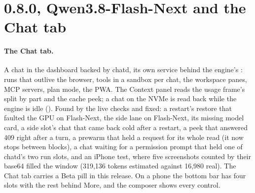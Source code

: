 \section*{0.8.0, Qwen3.8-Flash-Next and the Chat tab}

\paragraph{The Chat tab.} A chat in the dashboard backed by chatd, its own service behind the engine's : runs that outlive the browser, tools in a sandbox per chat, the workspace panes, MCP servers, plan mode, the PWA. The Context panel reads the usage frame's split by part and the cache peek; a chat on the NVMe is read back while the engine is idle (). Found by the live checks and fixed: a restart's restore that faulted the GPU on Flash-Next, the side lane on Flash-Next, its missing model card, a side slot's chat that came back cold after a restart, a peek that answered 409 right after a turn, a prewarm that held a request for its whole read (it now stops between blocks), a chat waiting for a permission prompt that held one of chatd's two run slots, and an iPhone test, where five screenshots counted by their base64 filled the window (319,136 tokens estimated against 16,980 real). The Chat tab carries a Beta pill in this release. On a phone the bottom bar has four slots with the rest behind More, and the composer shows every control.

